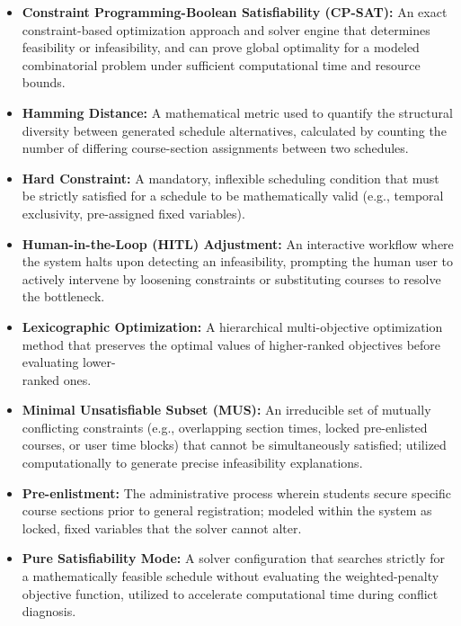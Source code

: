 \documentclass{icsthesis}
\begin{document}
\begin{mainmatter}
\begin{itemize}
			\item \textbf{Constraint Programming-Boolean Satisfiability (CP-SAT):} An exact constraint-based optimization approach and solver engine that determines feasibility or infeasibility, and can prove global optimality for a modeled combinatorial problem under sufficient computational time and resource bounds.
			
			\item \textbf{Hamming Distance:} A mathematical metric used to quantify the structural diversity between generated schedule alternatives, calculated by counting the number of differing course-section assignments between two schedules.

			\item \textbf{Hard Constraint:} A mandatory, inflexible scheduling condition that must be strictly satisfied for a schedule to be mathematically valid (e.g., temporal exclusivity, pre-assigned fixed variables).
			
			\item \textbf{Human-in-the-Loop (HITL) Adjustment:} An interactive workflow where the system halts upon detecting an infeasibility, prompting the human user to actively intervene by loosening constraints or substituting courses to resolve the bottleneck.
			
			\item \textbf{Lexicographic Optimization:} A hierarchical multi-objective optimization method that preserves the optimal values of higher-ranked objectives before evaluating lower-\\ranked ones.

			\item \textbf{Minimal Unsatisfiable Subset (MUS):} An irreducible set of mutually conflicting constraints (e.g., overlapping section times, locked pre-enlisted courses, or user time blocks) that cannot be simultaneously satisfied; utilized computationally to generate precise infeasibility explanations.

			\item \textbf{Pre-enlistment:} The administrative process wherein students secure specific course sections prior to general registration; modeled within the system as locked, fixed variables that the solver cannot alter.

			\item \textbf{Pure Satisfiability Mode:} A solver configuration that searches strictly for a mathematically feasible schedule without evaluating the weighted-penalty objective function, utilized to accelerate computational time during conflict diagnosis.


\end{itemize}
\end{mainmatter}
\end{document}
